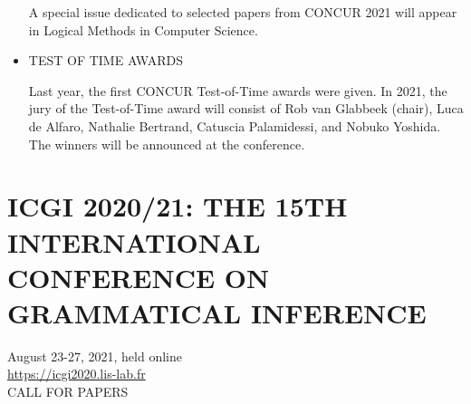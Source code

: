 \documentclass{article}
\begin{document}
\begin{itemize}
  A special issue dedicated to selected papers from CONCUR 2021 will appear in Logical Methods in Computer Science. 
 
\item  TEST OF TIME AWARDS 
 
  Last year, the first CONCUR Test-of-Time awards were given. In 2021, the jury of the Test-of-Time award will consist of Rob van Glabbeek (chair), Luca de Alfaro, Nathalie Bertrand, Catuscia Palamidessi, and Nobuko Yoshida. The winners will be announced at the conference. 
 
\end{itemize}\section{ICGI 2020/21: THE 15TH INTERNATIONAL CONFERENCE ON GRAMMATICAL INFERENCE}\label{ICGI202021}  August 23-27, 2021, held online\\ 
  \href{https://icgi2020.lis-lab.fr}{https://icgi2020.lis-lab.fr}\\ 
CALL FOR PAPERS 
\end{document}
